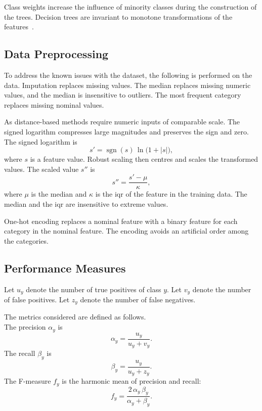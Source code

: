 \documentclass[conference]{IEEEtran}
\begin{document}
Class weights increase the influence of minority classes during the construction of the trees.
Decision trees are invariant to monotone transformations of the features~\cite{Hastie2009}.

\subsection{Data Preprocessing}
\label{sub:preproc}
To address the known issues with the dataset, the following is performed on the data.
Imputation replaces missing values.
The median replaces missing numeric values, and the median is insensitive to outliers.
The most frequent category replaces missing nominal values.

As distance-based methods require numeric inputs of comparable scale.
The signed logarithm compresses large magnitudes and preserves the sign and zero.
The signed logarithm is
\begin{equation}
s' = \operatorname{sgn}(s)\, \ln\bigl(1 + \lvert s \rvert\bigr) ,
\label{eq:slog}
\end{equation}
where $s$ is a feature value.
Robust scaling then centres and scales the transformed values.
The scaled value $s''$ is
\begin{equation}
s'' = \frac{s' - \mu}{\kappa} ,
\label{eq:robust}
\end{equation}
where $\mu$ is the median and $\kappa$ is the \gls{iqr} of the feature in the training data.
The median and the \gls{iqr} are insensitive to extreme values.

One-hot encoding replaces a nominal feature with a binary feature for each category in the nominal feature.
The encoding avoids an artificial order among the categories.

\subsection{Performance Measures}
\label{sub:measures}

Let $u_y$ denote the number of true positives of class $y$.
Let $v_y$ denote the number of false positives.
Let $z_y$ denote the number of false negatives.

The metrics considered are defined as follows.
\\
The precision $\alpha_y$ is
\begin{equation}
\alpha_y = \frac{u_y}{u_y + v_y} .
\label{eq:precision}
\end{equation}
The recall $\beta_y$ is
\begin{equation}
\beta_y = \frac{u_y}{u_y + z_y} .
\label{eq:recall}
\end{equation}
The F-measure $f_y$ is the harmonic mean of precision and recall:
\begin{equation}
f_y = \frac{2\, \alpha_y\, \beta_y}{\alpha_y + \beta_y} .
\label{eq:fmeasure}
\end{equation}
\end{document}
